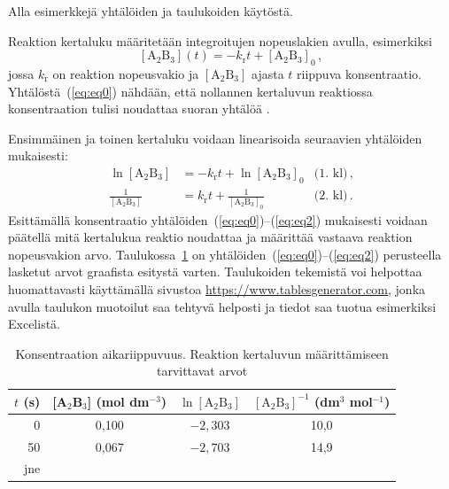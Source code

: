\documentclass[a4paper, 12pt, finnish]{article}
\begin{document}
Alla esimerkkejä yhtälöiden ja taulukoiden käytöstä.

Reaktion kertaluku määritetään integroitujen nopeuslakien avulla, esimerkiksi
\begin{equation} \label{eq:eq0}
[\mathrm{A}_2\mathrm{B}_3](t) = -k_\mathrm{r} t + [\mathrm{A}_2\mathrm{B}_3]_0 \,,
\end{equation}
% 
jossa $k_\mathrm{r}$ on reaktion nopeusvakio ja $[\mathrm{A}_2\mathrm{B}_3]$ ajasta $t$ riippuva konsentraatio. 
Yhtälöstä~(\ref{eq:eq0}) %
nähdään, että nollannen kertaluvun reaktiossa konsentraation tulisi noudattaa suoran yhtälöä \cite{atkins}. 

Ensimmäinen ja toinen kertaluku voidaan linearisoida seuraavien yhtälöiden mukaisesti:
\begin{align} 
 \ln [\mathrm{A}_2\mathrm{B}_3] &= -k_\mathrm{r} t + \ln [\mathrm{A}_2\mathrm{B}_3]_0  \label{eq:eq1} & \text{(1. kl)}\,, \\
 \frac{1}{[\mathrm{A}_2\mathrm{B}_3]} &= k_\mathrm{r} t + \frac{1}{[\mathrm{A}_2\mathrm{B}_3]_0}  \label{eq:eq2} & \text{(2. kl)} \,.
\end{align}
Esittämällä konsentraatio yhtälöiden~(\ref{eq:eq0})--(\ref{eq:eq2}) mukaisesti voidaan päätellä mitä kertalukua reaktio noudattaa ja määrittää vastaava reaktion nopeusvakion arvo. Taulukossa~\ref{tab:esimtable} on yhtälöiden~(\ref{eq:eq0})--(\ref{eq:eq2}) perusteella lasketut arvot graafista esitystä varten. 
Taulukoiden tekemistä voi helpottaa huomattavasti käyttämällä sivustoa \url{https://www.tablesgenerator.com}, jonka avulla taulukon muotoilut saa tehtyvä helposti ja tiedot saa tuotua esimerkiksi Excelistä.

\begin{table}[!hbtp] \begin{center}
\caption{\label{tab:esimtable} Konsentraation aikariippuvuus. Reaktion kertaluvun määrittämiseen tarvittavat arvot}
\begin{tabular}{rccc}
\hline\hline  %
$t$ (s) & [A$_2$B$_3$] (mol dm$^{-3}$) & $\ln [\mathrm{A}_2\mathrm{B}_3]$ & $ [\mathrm{A}_2\mathrm{B}_3]^{-1}$ (dm$^3$ mol$^{-1}$)\\
\hline %
0 & 0,100 & $-2{,}303$ & 10,0 \\
50 & 0,067 & $-2{,}703$ & 14,9 \\
jne &  &  & \\
\hline\hline %
\end{tabular}\end{center}
\end{table}
\end{document}

